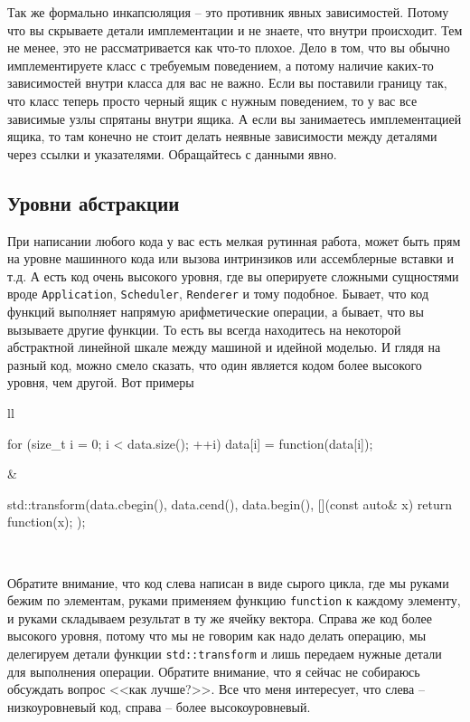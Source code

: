 Так же формально инкапсюляция -- это противник явных зависимостей.
Потому что вы скрываете детали имплементации и не знаете, что внутри происходит.
Тем не менее, это не рассматривается как что-то плохое.
Дело в том, что вы обычно имплементируете класс с требуемым поведением, а потому наличие каких-то зависимостей внутри класса для вас не важно.
Если вы поставили границу так, что класс теперь просто черный ящик с нужным поведением, то у вас все зависимые узлы спрятаны внутри ящика.
А если вы занимаетесь имплементацией ящика, то там конечно не стоит делать неявные зависимости между деталями через ссылки и указателями.
Обращайтесь с данными явно.

\subsection{Уровни абстракции}
\label{section::AbstractionLevels}

При написании любого кода у вас есть мелкая рутинная работа, может быть прям на уровне машинного кода или вызова интринзиков или ассемблерные вставки и т.д.
А есть код очень высокого уровня, где вы оперируете сложными сущностями вроде \verb"Application", \verb"Scheduler", \verb"Renderer" и тому подобное.
Бывает, что код функций выполняет напрямую арифметические операции, а бывает, что вы вызываете другие функции.
То есть вы всегда находитесь на некоторой абстрактной линейной шкале между машиной и идейной моделью.
И глядя на разный код, можно смело сказать, что один является кодом более высокого уровня, чем другой.
Вот примеры
\begin{center}
\begin{tabular}{ll}
{
\begin{minipage}[\baselineskip]{8cm}
\begin{cppcode}[numbers = none]

for (size_t i = 0; i < data.size(); ++i) {
  data[i] = function(data[i]);
}
\end{cppcode}
\end{minipage}
}&{
\begin{minipage}[\baselineskip]{8cm}
\begin{cppcode}[numbers = none]
std::transform(data.cbegin(), data.cend(),
    data.begin(), [](const auto& x) {
  return function(x);
});
\end{cppcode}
\end{minipage}
}\\
\end{tabular}
\end{center}
Обратите внимание, что код слева написан в виде сырого цикла, где мы руками бежим по элементам, руками применяем функцию \verb"function" к каждому элементу, и руками складываем результат в ту же ячейку вектора.
Справа же код более высокого уровня, потому что мы не говорим как надо делать операцию, мы делегируем детали функции \verb"std::transform" и лишь передаем нужные детали для выполнения операции.
Обратите внимание, что я сейчас не собираюсь обсуждать вопрос <<как лучше?>>.
Все что меня интересует, что слева -- низкоуровневый код, справа -- более высокоуровневый.


